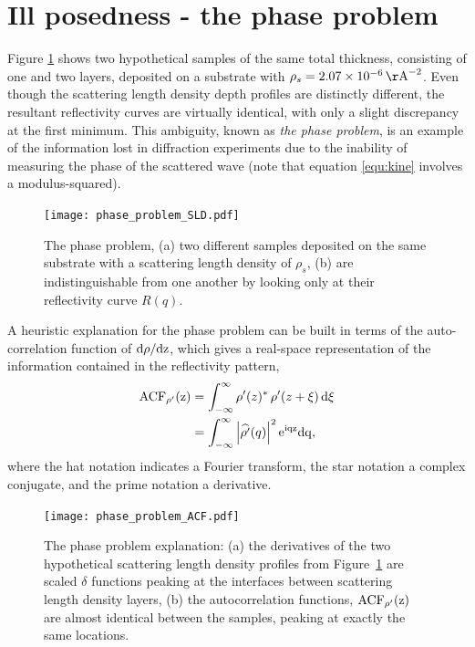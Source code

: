\documentclass[
 reprint,
 superscriptaddress,
 amsmath,amssymb,
 aps,
]{revtex4-1}
\newcommand{\rmd}{\rm{d}}
\newcommand{\acf}{\rm{ACF}}
\newcommand{\angstrom}{\rm{\AA}}
\begin{document}
\section{Ill posedness - the phase problem}
Figure \ref{fig:phase_problem_sld} shows two hypothetical samples of the same total thickness, consisting of one and two layers, deposited on a substrate with $\rho_s = \SI{2.07e-6}{\angstrom^{-2}}$.
Even though the scattering length density depth profiles are distinctly different, the resultant reflectivity curves are virtually identical, with only a slight discrepancy at the first minimum.
This ambiguity, known as \emph{the phase problem}, is an example of the information lost in diffraction experiments due to the inability of measuring the phase of the scattered wave (note that equation \ref{equ:kine} involves a modulus-squared).
\begin{figure}
    \texttt{[image: phase\_problem\_SLD.pdf]}
    \caption{The phase problem, (a) two different samples deposited on the same substrate with a scattering length density of $\rho_s$, (b) are indistinguishable from one another by looking only at their reflectivity curve $R(q)$.}
    \label{fig:phase_problem_sld}
\end{figure}
A heuristic explanation for the phase problem can be built in terms of the auto-correlation function of $\rmd\rho/\rmd z$, which gives a real-space representation of the information contained in the reflectivity pattern,
%
\begin{equation}
    \begin{aligned}
        \acf_{\rho'}(z) & = \int_{-\infty}^{\infty} \rho'(z)^* \, \rho'(z + \xi) \, \rmd \xi \\
                        & = \int_{-\infty}^{\infty} \left| \widehat{\rho'}(q)  \right|^{2} \rm{e}^{iqz} \rmd q,
    \end{aligned}
    \label{equ:acf}
\end{equation}
%
where the hat notation indicates a Fourier transform, the star notation a complex conjugate, and the prime notation a derivative.
\begin{figure}
    \texttt{[image: phase\_problem\_ACF.pdf]}
    \caption{The phase problem explanation: (a) the derivatives of the two hypothetical scattering length density profiles from Figure~\ref{fig:phase_problem_sld} are scaled $\delta$ functions peaking at the interfaces between scattering length density layers, (b) the autocorrelation functions, $\acf_{\rho'}(z)$ are almost identical between the samples, peaking at exactly the same locations.}
    \label{fig:phase_problem_acf}
\end{figure}
\end{document}

